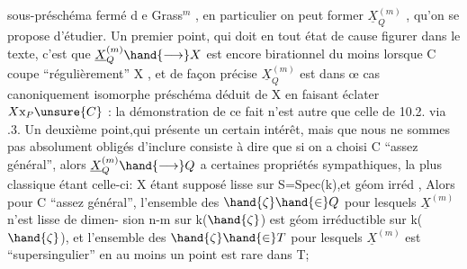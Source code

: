 
sous-préschéma fermé d e Grass$^{m}$ , en particulier on peut former $\underline{X}^{(m)}_{Q}$ ,
qu'on se propose d'étudier. Un premier point, qui doit en tout état de
cause figurer dans le texte, c'est que $\underline{X}^{(m)}_{Q} \hand{\longrightarrow} X$ est encore birationnel
du moins lorsque C coupe ``régulièrement'' X , et de façon précise $\underline{X}^{(m)}_{Q}$
est dans œ cas canoniquement isomorphe  préschéma déduit de X en
faisant éclater $X\mathrm{x}_{P}\unsure{C}$ : la démonstration de ce fait n'est autre que celle
de 10.2. via .3. Un deuxième point,qui présente un certain intérêt,
mais que nous ne sommes pas absolument obligés d'inclure consiste à
dire que si on a choisi C ``assez général'', alors $\underline{X}^{(m)}_{Q} \hand{\longrightarrow} Q$ a certaines
propriétés sympathiques, la plus classique étant celle-ci: X étant
supposé lisse sur S=Spec(k),et  géom irréd , Alors pour C ``assez
général'', l'ensemble des $\hand{\zeta}\hand{\in} Q$ pour lesquels $\underline{X}^{(m)}$ n'est lisse de dimen-%
sion n-m sur k($\hand{\zeta}$) est géom irréductible sur k($\hand{\zeta}$), et 
l'ensemble des $\hand{\zeta}\hand{\in} T$ pour lesquels $\underline{X}^{(m)}$ est ``supersingulier'' en au
moins un point est rare dans T;
